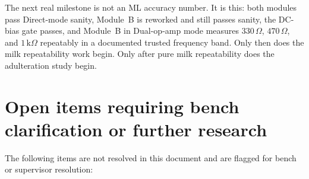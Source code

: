 \documentclass[11pt,a4paper]{article}
\newcommand{\kohm}[1]{\ensuremath{#1\,\mathrm{k}\Omega}}
\newcommand{\Rohm}[1]{\ensuremath{#1\,\Omega}}
\begin{document}
\begin{verdictbox}
The next real milestone is not an ML accuracy number. It is this: both modules pass Direct-mode sanity, Module~B is reworked and still passes sanity, the DC-bias gate passes, and Module~B in Dual-op-amp mode measures \Rohm{330}, \Rohm{470}, and \kohm{1} repeatably in a documented trusted frequency band. Only then does the milk repeatability work begin. Only after pure milk repeatability does the adulteration study begin.
\end{verdictbox}

\section*{Open items requiring bench clarification or further research}

The following items are not resolved in this document and are flagged for bench or supervisor resolution:
\end{document}
